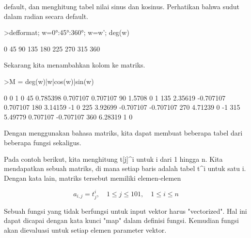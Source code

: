 \documentclass[a4paper,10pt]{article}
\begin{document}
\begin{eulernotebook}
\begin{eulercomment}
default, dan menghitung tabel nilai sinus dan kosinus. Perhatikan
bahwa sudut dalam radian secara default.
\end{eulercomment}
\begin{eulerprompt}
>defformat; w=0°:45°:360°; w=w'; deg(w)
\end{eulerprompt}
\begin{euleroutput}
              0 
             45 
             90 
            135 
            180 
            225 
            270 
            315 
            360 
\end{euleroutput}
\begin{eulercomment}
Sekarang kita menambahkan kolom ke matriks.
\end{eulercomment}
\begin{eulerprompt}
>M = deg(w)|w|cos(w)|sin(w)
\end{eulerprompt}
\begin{euleroutput}
              0             0             1             0 
             45      0.785398      0.707107      0.707107 
             90        1.5708             0             1 
            135       2.35619     -0.707107      0.707107 
            180       3.14159            -1             0 
            225       3.92699     -0.707107     -0.707107 
            270       4.71239             0            -1 
            315       5.49779      0.707107     -0.707107 
            360       6.28319             1             0 
\end{euleroutput}
\begin{eulercomment}
Dengan menggunakan bahasa matriks, kita dapat membuat beberapa tabel
dari beberapa fungsi sekaligus.

Pada contoh berikut, kita menghitung t[j]\textasciicircum{}i untuk i dari 1 hingga n.
Kita mendapatkan sebuah matriks, di mana setiap baris adalah tabel t\textasciicircum{}i
untuk satu i. Dengan kata lain, matriks tersebut memiliki
elemen-elemen\\
\end{eulercomment}
\begin{eulerformula}
\[
a_{i, j}=t_j^i, \quad 1 \le j \le 101, \quad 1 \le i \le n
\]
\end{eulerformula}
\begin{eulercomment}
Sebuah fungsi yang tidak berfungsi untuk input vektor harus
"vectorized". Hal ini dapat dicapai dengan kata kunci "map" dalam
definisi fungsi. Kemudian fungsi akan dievaluasi untuk setiap elemen
parameter vektor.


\end{eulercomment}
\end{eulernotebook}
\end{document}
